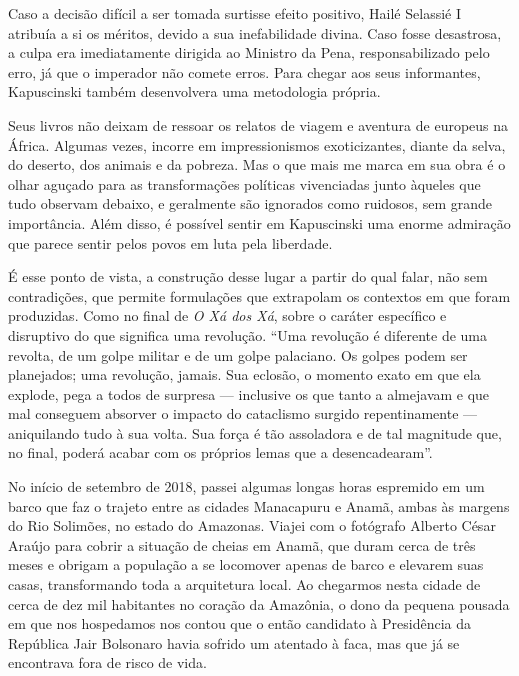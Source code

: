 Caso a decisão difícil a ser tomada surtisse efeito positivo, Hailé
Selassié I atribuía a si os méritos, devido a sua inefabilidade divina.
Caso fosse desastrosa, a culpa era imediatamente dirigida ao Ministro da
Pena, responsabilizado pelo erro, já que o imperador não comete erros.
Para chegar aos seus informantes, Kapuscinski também desenvolvera uma
metodologia própria.

Seus livros não deixam de ressoar os relatos de viagem e aventura de
europeus na África. Algumas vezes, incorre em impressionismos
exoticizantes, diante da selva, do deserto, dos animais e da pobreza.
Mas o que mais me marca em sua obra é o olhar aguçado para as
transformações políticas vivenciadas junto àqueles que tudo observam
debaixo, e geralmente são ignorados como ruidosos, sem grande
importância. Além disso, é possível sentir em Kapuscinski uma enorme
admiração que parece sentir pelos povos em luta pela liberdade.

É esse ponto de vista, a construção desse lugar a partir do qual falar,
não sem contradições, que permite formulações que extrapolam os
contextos em que foram produzidas. Como no final de \emph{O Xá dos Xá},
sobre o caráter específico e disruptivo do que significa uma revolução.
``Uma revolução é diferente de uma revolta, de um golpe militar e de um
golpe palaciano. Os golpes podem ser planejados; uma revolução, jamais.
Sua eclosão, o momento exato em que ela explode, pega a todos de
surpresa --- inclusive os que tanto a almejavam e que mal conseguem
absorver o impacto do cataclismo surgido repentinamente --- aniquilando
tudo à sua volta. Sua força é tão assoladora e de tal magnitude que, no
final, poderá acabar com os próprios lemas que a desencadearam''.

\asterisc

No início de setembro de 2018, passei algumas longas horas espremido em
um barco que faz o trajeto entre as cidades Manacapuru e Anamã, ambas às
margens do Rio Solimões, no estado do Amazonas. Viajei com o fotógrafo
Alberto César Araújo para cobrir a situação de cheias em Anamã, que duram cerca de
três meses e obrigam a população a se locomover apenas de barco e
elevarem suas casas, transformando toda a arquitetura local. Ao
chegarmos nesta cidade de cerca de dez mil habitantes no coração da
Amazônia, o dono da pequena pousada em que nos hospedamos nos contou que o
então candidato à Presidência da República Jair Bolsonaro havia sofrido
um atentado à faca, mas que já se encontrava fora de risco de vida.

